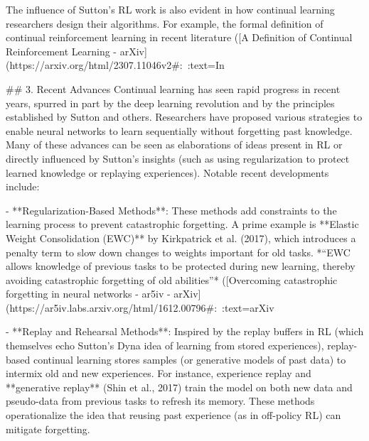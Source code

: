 The influence of Sutton’s RL work is also evident in how continual learning researchers design their algorithms. For example, the formal definition of continual reinforcement learning in recent literature ([A Definition of Continual Reinforcement Learning - arXiv](https://arxiv.org/html/2307.11046v2#:~:text=In%

## 3. Recent Advances
Continual learning has seen rapid progress in recent years, spurred in part by the deep learning revolution and by the principles established by Sutton and others. Researchers have proposed various strategies to enable neural networks to learn sequentially without forgetting past knowledge. Many of these advances can be seen as elaborations of ideas present in RL or directly influenced by Sutton’s insights (such as using regularization to protect learned knowledge or replaying experiences). Notable recent developments include:

- **Regularization-Based Methods**: These methods add constraints to the learning process to prevent catastrophic forgetting. A prime example is **Elastic Weight Consolidation (EWC)** by Kirkpatrick et al. (2017), which introduces a penalty term to slow down changes to weights important for old tasks. *“EWC allows knowledge of previous tasks to be protected during new learning, thereby avoiding catastrophic forgetting of old abilities”* ([Overcoming catastrophic forgetting in neural networks - ar5iv - arXiv](https://ar5iv.labs.arxiv.org/html/1612.00796#:~:text=arXiv%

- **Replay and Rehearsal Methods**: Inspired by the replay buffers in RL (which themselves echo Sutton’s Dyna idea of learning from stored experiences), replay-based continual learning stores samples (or generative models of past data) to intermix old and new experiences. For instance, experience replay and **generative replay** (Shin et al., 2017) train the model on both new data and pseudo-data from previous tasks to refresh its memory. These methods operationalize the idea that reusing past experience (as in off-policy RL) can mitigate forgetting.

